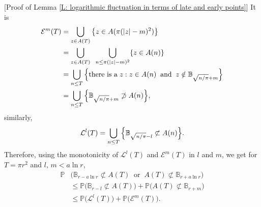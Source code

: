 \documentclass[11pt]{article}
\makeatletter
\renewenvironment{proof}[1][\proofname]{
   \par\pushQED{\qed}\normalfont
   \topsep6\p@\@plus6\p@\relax
   \trivlist\item[\hskip\labelsep\bfseries#1\@addpunct{.}]
   \ignorespaces
}{
   \popQED\endtrivlist\@endpefalse
}
\numberwithin{equation}{section}
\makeatother
\begin{document}
\begin{proof}
  [Proof of Lemma \ref{L: logarithmic fluctuation in terms of late and early points}]
  It is 
  \begin{equation}\label{eq: early points as a union}
  \begin{split}
    \mathcal{E}^m(T) &= 
      \bigcup_{z \in A(T)} 
        \big{\{}z \in A(\pi(|z|-m)^2)\big{\}}\\
    &= \bigcup_{z \in A(T)} 
        \;\; \bigcup_{n \leq \pi(|z|-m)^2} 
          \{z \in A(n)\}\\
    &= \bigcup_{n \leq T} 
        \Big{\{}\text{there is a} 
          \;z : z \in A(n) \;\;
            \text{and}\;\; 
            z \notin \mathbb{B}_{\sqrt{n/ \pi}+m} 
            \Big{\}}\\
    &= \bigcup_{n \leq T} 
        \Big{\{} \mathbb{B}_{\sqrt{n/ \pi}+m} 
          \not\supset A(n) \Big{\}},
  \end{split}
  \end{equation} 
  similarly, 
  \begin{equation}\nonumber
    \mathcal{L}^l(T) 
    = \bigcup_{n \leq T} 
      \Big{\{} \mathbb{B}_{\sqrt{n/\pi} -l} 
        \not\subset A(n) \Big{\}}.
  \end{equation} 
  Therefore, using the monotonicity of $\mathcal{L}^l(T)$ 
  and $\mathcal{E}^m(T)$ in $l$ and $m$,
  we get for $T = \pi r^2$ and 
  $l, \, m < a \ln r$,   
  \begin{equation}\nonumber
  \begin{split}
    \mathbb{P}& \big( 
      \mathbb{B}_{r - a \ln r} \not\subset A(T) 
        \;\; \text{or} \;\;  
          A(T) \not\subset \mathbb{B}_{r+a \ln r}\big)\\
    &\leq \mathbb{P} \big( \mathbb{B}_{r-l} \not\subset A(T)\big) 
        + \mathbb{P} \big( A(T) \not\subset \mathbb{B}_{r+m} \big)\\
    &\leq \mathbb{P} \big( \mathcal{L}^l(T)\big) 
    +\mathbb{P} \big( \mathcal{E}^m(T)\big).
  \end{split}
  \end{equation}
\end{proof}
\end{document}
